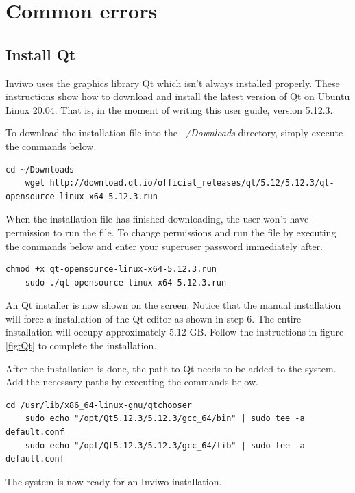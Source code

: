 \section{Common errors}
\label{sec:Common errors}

\subsection{Install Qt}
Inviwo uses the graphics library Qt which isn't always installed properly. These instructions show how to download and install the latest version of Qt on Ubuntu Linux 20.04. That is, in the moment of writing this user guide, version 5.12.3. 

To download the installation file into the \emph{~/Downloads} directory, simply execute the commands below.

\begin{lstlisting}[frame = single, breaklines=true]
    cd ~/Downloads
    wget http://download.qt.io/official_releases/qt/5.12/5.12.3/qt-opensource-linux-x64-5.12.3.run
\end{lstlisting}

When the installation file has finished downloading, the user won't have permission to run the file. To change permissions and run the file by executing the commands below and enter your superuser password immediately after.
\begin{lstlisting}[frame = single, breaklines=true]
    chmod +x qt-opensource-linux-x64-5.12.3.run
    sudo ./qt-opensource-linux-x64-5.12.3.run
\end{lstlisting}

An Qt installer is now shown on the screen. Notice that the manual installation will force a installation of the Qt editor as shown in step 6. The entire installation will occupy approximately 5.12 GB. Follow the instructions in figure \ref{fig:Qt} to complete the installation.

After the installation is done, the path to Qt needs to be added to the system. Add the necessary paths by executing the commands below.

\begin{lstlisting}[frame = single, breaklines=true]
    cd /usr/lib/x86_64-linux-gnu/qtchooser
    sudo echo "/opt/Qt5.12.3/5.12.3/gcc_64/bin" | sudo tee -a default.conf
    sudo echo "/opt/Qt5.12.3/5.12.3/gcc_64/lib" | sudo tee -a default.conf
\end{lstlisting}

The system is now ready for an Inviwo installation.

